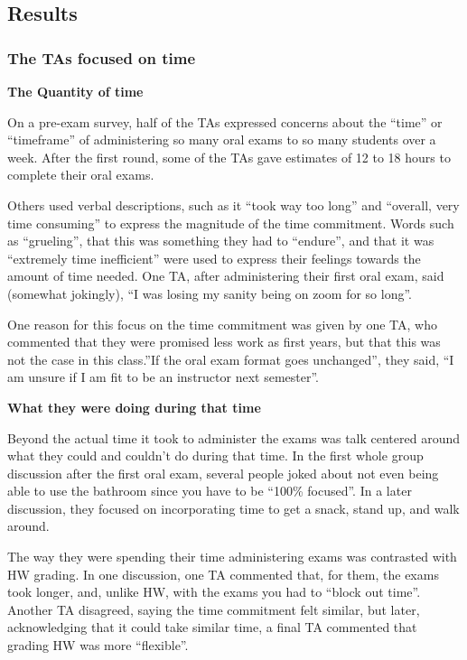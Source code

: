 \documentclass[
  letterpaper,
  DIV=11,
  numbers=noendperiod]{scrartcl}
\begin{document}
\hypertarget{results}{%
\subsection{Results}\label{results}}

\hypertarget{the-tas-focused-on-time}{%
\subsubsection{The TAs focused on time}\label{the-tas-focused-on-time}}

\textbf{The Quantity of time}

On a pre-exam survey, half of the TAs expressed concerns about the
``time'' or ``timeframe'' of administering so many oral exams to so many
students over a week. After the first round, some of the TAs gave
estimates of 12 to 18 hours to complete their oral exams.

Others used verbal descriptions, such as it ``took way too long'' and
``overall, very time consuming'' to express the magnitude of the time
commitment. Words such as ``grueling'', that this was something they had
to ``endure'', and that it was ``extremely time inefficient'' were used
to express their feelings towards the amount of time needed. One TA,
after administering their first oral exam, said (somewhat jokingly), ``I
was losing my sanity being on zoom for so long''.

One reason for this focus on the time commitment was given by one TA,
who commented that they were promised less work as first years, but that
this was not the case in this class.''If the oral exam format goes
unchanged'', they said, ``I am unsure if I am fit to be an instructor
next semester''.

\textbf{What they were doing during that time}

Beyond the actual time it took to administer the exams was talk centered
around what they could and couldn't do during that time. In the first
whole group discussion after the first oral exam, several people joked
about not even being able to use the bathroom since you have to be
``100\% focused''. In a later discussion, they focused on incorporating
time to get a snack, stand up, and walk around.

The way they were spending their time administering exams was contrasted
with HW grading. In one discussion, one TA commented that, for them, the
exams took longer, and, unlike HW, with the exams you had to ``block out
time''. Another TA disagreed, saying the time commitment felt similar,
but later, acknowledging that it could take similar time, a final TA
commented that grading HW was more ``flexible''.
\end{document}
